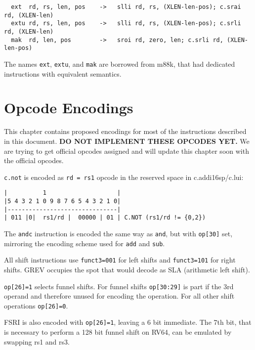 \begin{minipage}{\linewidth}
\begin{verbatim}
  ext  rd, rs, len, pos    ->   slli rd, rs, (XLEN-len-pos); c.srai rd, (XLEN-len)
  extu rd, rs, len, pos    ->   slli rd, rs, (XLEN-len-pos); c.srli rd, (XLEN-len)
  mak  rd, len, pos        ->   sroi rd, zero, len; c.srli rd, (XLEN-len-pos)
\end{verbatim}
\end{minipage}

The names {\tt ext}, {\tt extu}, and {\tt mak} are borrowed from m88k, that had
dedicated instructions with equivalent semantics.~\cite[p.~3-28]{m88k}


\section{Opcode Encodings}
\label{opcodes}

This chapter contains proposed encodings for most of the instructions described
in this document. {\bf DO NOT IMPLEMENT THESE OPCODES YET.} We are trying to get
official opcodes assigned and will update this chapter soon with the official
opcodes.

{\tt c.not} is encoded as {\tt rd = rs1} opcode in the reserved space in
c.addi16sp/c.lui:

\begin{minipage}{\linewidth}
\begin{verbatim}
|          1                    |
|5 4 3 2 1 0 9 8 7 6 5 4 3 2 1 0|
|-------------------------------|
| 011 |0|  rs1/rd |  00000 | 01 | C.NOT (rs1/rd != {0,2})
\end{verbatim}
\end{minipage}

The {\tt andc} instruction is encoded the same way as {\tt and}, but with
{\tt op[30]} set, mirroring the encoding scheme used for {\tt add} and {\tt sub}.

All shift instructions use {\tt funct3=001} for left shifts and {\tt funct3=101}
for right shifts. GREV occupies the spot that would decode as SLA (arithmetic
left shift).

{\tt op[26]=1} selects funnel shifts. For funnel shifts {\tt op[30:29]} is part
if the 3rd operand and therefore unused for encoding the operation. For all other
shift operations {\tt op[26]=0}.

FSRI is also encoded with {\tt op[26]=1}, leaving a 6 bit immediate. The 7th
bit, that is necessary to perform a 128 bit funnel shift on RV64, can be
emulated by swapping rs1 and rs3.

